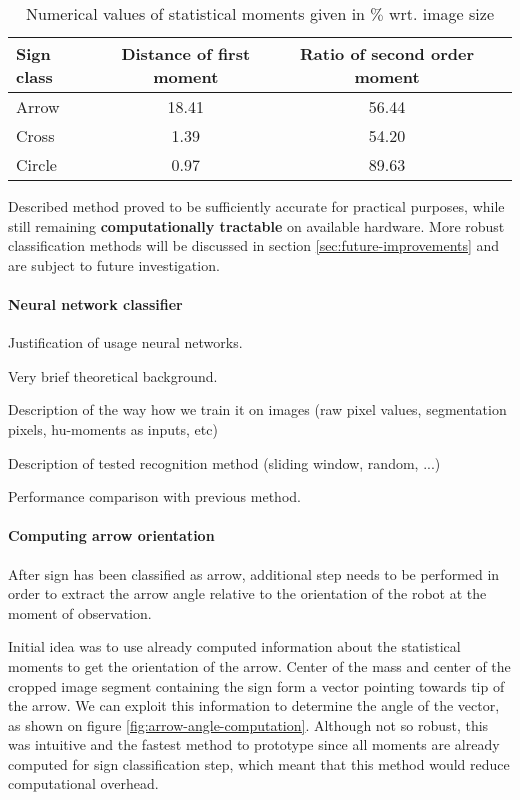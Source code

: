 \begin{table}[th!]
\centering
\begin{tabular}{l*{2}{c}r}
	Sign class			& Distance of first moment & Ratio of second order moment  \\
	\hline
	Arrow 				& 18.41 & 56.44  \\
	Cross            	& 1.39 & 54.20  \\
	Circle           	& 0.97 & 89.63  \\
\end{tabular}
\caption{Numerical values of statistical moments given in $\%$ wrt. image size}
\label{tab:moments}
\end{table}

Described method proved to be sufficiently accurate for practical purposes, while still remaining \textbf{computationally tractable} on available hardware. More robust classification methods will be discussed in section \ref{sec:future-improvements} and are subject to future investigation.

\paragraph{Neural network classifier}

Justification of usage neural networks.

Very brief theoretical background.

Description of the way how we train it on images (raw pixel values, segmentation pixels, hu-moments as inputs, etc)

Description of tested recognition method (sliding window, random, ...)

Performance comparison with previous method.

\paragraph{Computing arrow orientation}

After sign has been classified as arrow, additional step needs to be performed in order to extract the arrow angle relative to the orientation of the robot at the moment of observation.

Initial idea was to use already computed information about the statistical moments to get the orientation of the arrow. Center of the mass and center of the cropped image segment containing the sign form a vector pointing towards tip of the arrow. We can exploit this information to determine the angle of the vector, as shown on figure \ref{fig:arrow-angle-computation}. Although not so robust, this was intuitive and the fastest method to prototype since all moments are already computed for sign classification step, which meant that this method would reduce computational overhead.

